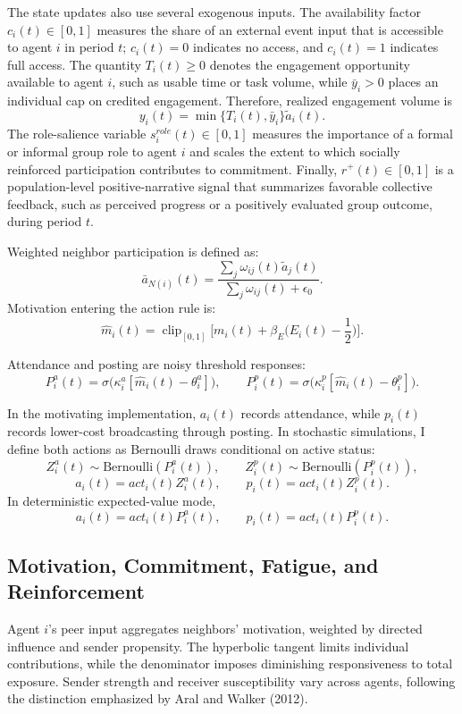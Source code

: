 \documentclass[11pt]{article}
\newcommand{\clip}{\operatorname{clip}_{[0,1]}}
\begin{document}
The state updates also use several exogenous inputs. The availability factor $c_i(t)\in [0,1]$ measures the share of an external event input that is accessible to agent $i$ in period $t$; $c_i(t)=0$ indicates no access, and $c_i(t)=1$ indicates full access. The quantity $T_i(t) \ge 0$ denotes the engagement opportunity available to agent $i$, such as usable time or task volume, while $\bar{y}_i>0$ places an individual cap on credited engagement. Therefore, realized engagement volume is 
\[
y_i(t)=\min\{T_i(t), \bar{y}_i\}\tilde{a}_i(t).
\]
The role-salience variable $s_i^{role}(t)\in[0,1]$ measures the importance of a formal or informal group role to agent $i$ and scales the extent to which socially reinforced participation contributes to commitment. Finally, $r^+(t)\in[0,1]$ is a population-level positive-narrative signal that summarizes favorable collective feedback, such as perceived progress or a positively evaluated group outcome, during period $t$.   

Weighted neighbor participation is defined as: 
\begin{equation*}
\bar a_{N(i)}(t)=\frac{\sum_j \omega_{ij}(t)\tilde a_j(t)}{\sum_j\omega_{ij}(t)+\epsilon_0}.
\end{equation*}
Motivation entering the action rule is:
\[
\widehat{m}_i(t)=\clip\bigg[m_i(t)+\beta_E\Big(E_i(t)-\frac{1}{2}\Big)\bigg].
\]

Attendance and posting are noisy threshold responses:
\begin{equation}\tag{1}\label{eq:actions}
P^a_i(t)=\sigma\big(\kappa^a_i[\widehat m_i(t)-\theta^a_i]\big),\qquad
P^p_i(t)=\sigma\big(\kappa^p_i[\widehat m_i(t)-\theta^p_i]\big).
\end{equation}

In the motivating implementation, $a_i(t)$ records attendance, while $p_i(t)$ records lower-cost broadcasting through posting. In stochastic simulations, I define both actions as Bernoulli draws conditional on active status:
\[
Z_i^a(t)\sim \text{Bernoulli}(P_i^a(t)),
\qquad
Z_i^p(t)\sim \text{Bernoulli}(P_i^p(t)),
\]
\[
a_i(t)=act_i(t)Z_i^a(t),
\qquad
p_i(t)=act_i(t)Z_i^p(t).
\]
In deterministic expected-value mode,
\[
a_i(t)=act_i(t)P_i^a(t), \qquad p_i(t)=act_i(t)P_i^p(t).
\]
\subsection{Motivation, Commitment, Fatigue, and Reinforcement}

Agent $i$’s peer input aggregates neighbors’ motivation, weighted by directed influence and sender propensity. The hyperbolic tangent limits individual contributions, while the denominator imposes diminishing responsiveness to total exposure. Sender strength and receiver susceptibility vary across agents, following the distinction emphasized by Aral and Walker (2012).
\end{document}
